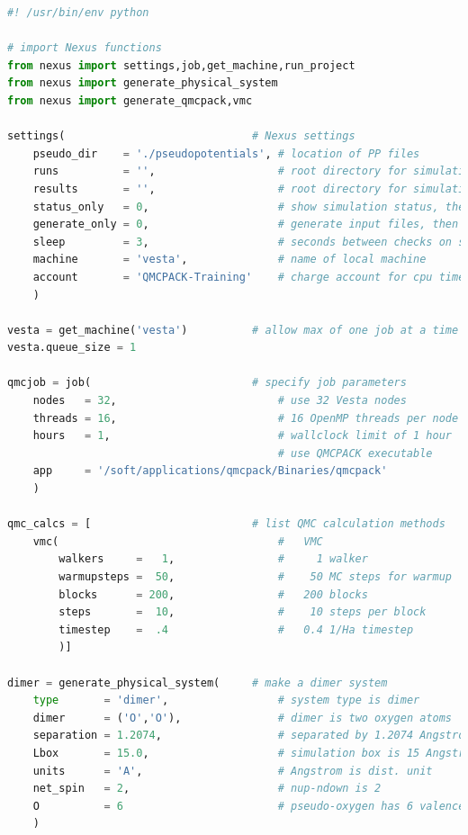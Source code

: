 \else

\begin{lstlisting}[language=Python]
#! /usr/bin/env python

# import Nexus functions
from nexus import settings,job,get_machine,run_project 
from nexus import generate_physical_system
from nexus import generate_qmcpack,vmc

settings(                             # Nexus settings
    pseudo_dir    = './pseudopotentials', # location of PP files
    runs          = '',                   # root directory for simulations
    results       = '',                   # root directory for simulation results
    status_only   = 0,                    # show simulation status, then exit
    generate_only = 0,                    # generate input files, then exit
    sleep         = 3,                    # seconds between checks on sim. progress
    machine       = 'vesta',              # name of local machine
    account       = 'QMCPACK-Training'    # charge account for cpu time
    ) 

vesta = get_machine('vesta')          # allow max of one job at a time (lab only)
vesta.queue_size = 1

qmcjob = job(                         # specify job parameters
    nodes   = 32,                         # use 32 Vesta nodes
    threads = 16,                         # 16 OpenMP threads per node (32 MPI tasks)
    hours   = 1,                          # wallclock limit of 1 hour
                                          # use QMCPACK executable
    app     = '/soft/applications/qmcpack/Binaries/qmcpack'
    )

qmc_calcs = [                         # list QMC calculation methods
    vmc(                                  #   VMC
        walkers     =   1,                #     1 walker
        warmupsteps =  50,                #    50 MC steps for warmup
        blocks      = 200,                #   200 blocks
        steps       =  10,                #    10 steps per block
        timestep    =  .4                 #   0.4 1/Ha timestep
        )]

dimer = generate_physical_system(     # make a dimer system
    type       = 'dimer',                 # system type is dimer
    dimer      = ('O','O'),               # dimer is two oxygen atoms
    separation = 1.2074,                  # separated by 1.2074 Angstrom
    Lbox       = 15.0,                    # simulation box is 15 Angstrom 
    units      = 'A',                     # Angstrom is dist. unit
    net_spin   = 2,                       # nup-ndown is 2
    O          = 6                        # pseudo-oxygen has 6 valence el.
    )


\end{lstlisting}
